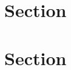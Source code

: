 \documentclass[a4paper]{article}
\begin{document}
\section{Section}

\section{Section}
\end{document}
